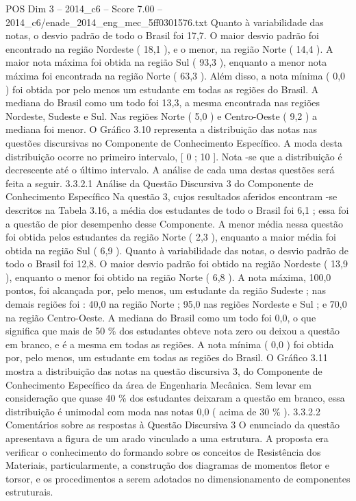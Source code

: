 \begin{textsample}{POS Dim 3 – 2014\_c6 – Score 7.00 – 2014\_c6/enade\_2014\_eng\_mec\_5ff0301576.txt}
Quanto à variabilidade das notas, o desvio padrão de todo o Brasil foi 17,7.
O maior desvio padrão foi encontrado na região Nordeste ( 18,1 ), e o menor, na região Norte ( 14,4 ).
A maior nota máxima foi obtida na região Sul ( 93,3 ), enquanto a menor nota máxima foi encontrada na região Norte ( 63,3 ).
Além disso, a nota mínima ( 0,0 ) foi obtida por pelo menos um estudante em todas as regiões do Brasil.
A mediana do Brasil como um todo foi 13,3, a mesma encontrada nas regiões Nordeste, Sudeste e Sul.
Nas regiões Norte ( 5,0 ) e Centro-Oeste ( 9,2 ) a mediana foi menor.
O Gráfico 3.10 representa a distribuição das notas nas questões discursivas no Componente de Conhecimento Específico.
A moda desta distribuição ocorre no primeiro intervalo, [ 0 ; 10 ].
Nota -se que a distribuição é decrescente até o último intervalo.
A análise de cada uma destas questões será feita a seguir. 3.3.2.1 Análise da Questão Discursiva 3 do Componente de Conhecimento Específico Na questão 3, cujos resultados aferidos encontram -se descritos na Tabela 3.16, a média dos estudantes de todo o Brasil foi 6,1 ; essa foi a questão de pior desempenho desse Componente.
A menor média nessa questão foi obtida pelos estudantes da região Norte ( 2,3 ), enquanto a maior média foi obtida na região Sul ( 6,9 ).
Quanto à variabilidade das notas, o desvio padrão de todo o Brasil foi 12,8.
O maior desvio padrão foi obtido na região Nordeste ( 13,9 ), enquanto o menor foi obtido na região Norte ( 6,8 ).
A nota máxima, 100,0 pontos, foi alcançada por, pelo menos, um estudante da região Sudeste ; nas demais regiões foi : 40,0 na região Norte ; 95,0 nas regiões Nordeste e Sul ; e 70,0 na região Centro-Oeste.
A mediana do Brasil como um todo foi 0,0, o que significa que mais de 50 \% dos estudantes obteve nota zero ou deixou a questão em branco, e é a mesma em todas as regiões.
A nota mínima ( 0,0 ) foi obtida por, pelo menos, um estudante em todas as regiões do Brasil.
O Gráfico 3.11 mostra a distribuição das notas na questão discursiva 3, do Componente de Conhecimento Específico da área de Engenharia Mecânica.
Sem levar em consideração que quase 40 \% dos estudantes deixaram a questão em branco, essa distribuição é unimodal com moda nas notas 0,0 ( acima de 30 \% ). 3.3.2.2 Comentários sobre as respostas à Questão Discursiva 3 O enunciado da questão apresentava a figura de um arado vinculado a uma estrutura.
A proposta era verificar o conhecimento do formando sobre os conceitos de Resistência dos Materiais, particularmente, a construção dos diagramas de momentos fletor e torsor, e os procedimentos a serem adotados no dimensionamento de componentes estruturais.

\end{textsample}
